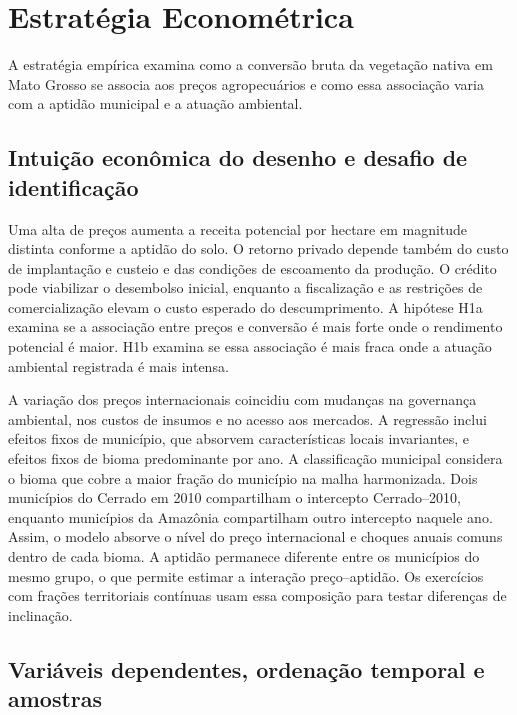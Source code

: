\section{Estratégia Econométrica}
\label{sec:estrategia}

A estratégia empírica examina como a conversão bruta da vegetação nativa em Mato Grosso se associa aos preços agropecuários e como essa associação varia com a aptidão municipal e a atuação ambiental.

\subsection{Intuição econômica do desenho e desafio de identificação}
\label{estrategia-intuicao}

Uma alta de preços aumenta a receita potencial por hectare em magnitude distinta conforme a aptidão do solo. O retorno privado depende também do custo de implantação e custeio e das condições de escoamento da produção. O crédito pode viabilizar o desembolso inicial, enquanto a fiscalização e as restrições de comercialização elevam o custo esperado do descumprimento. A hipótese H1a examina se a associação entre preços e conversão é mais forte onde o rendimento potencial é maior. H1b examina se essa associação é mais fraca onde a atuação ambiental registrada é mais intensa.

A variação dos preços internacionais coincidiu com mudanças na governança ambiental, nos custos de insumos e no acesso aos mercados. A regressão inclui efeitos fixos de município, que absorvem características locais invariantes, e efeitos fixos de bioma predominante por ano. A classificação municipal considera o bioma que cobre a maior fração do município na malha harmonizada. Dois municípios do Cerrado em 2010 compartilham o intercepto Cerrado--2010, enquanto municípios da Amazônia compartilham outro intercepto naquele ano. Assim, o modelo absorve o nível do preço internacional e choques anuais comuns dentro de cada bioma. A aptidão permanece diferente entre os municípios do mesmo grupo, o que permite estimar a interação preço--aptidão. Os exercícios com frações territoriais contínuas usam essa composição para testar diferenças de inclinação.

\subsection{Variáveis dependentes, ordenação temporal e amostras}
\label{estrategia-variaveis}

